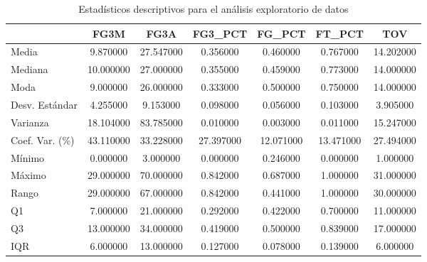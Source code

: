 \begin{table}
\caption{Estadísticos descriptivos para el análisis exploratorio de datos}
\label{tab:estadisticos_descriptivos_eda}
\begin{tabular}{|l|c|c|c|c|c|c|}
\toprule
 & FG3M & FG3A & FG3\_PCT & FG\_PCT & FT\_PCT & TOV \\
\midrule
Media & 9.870000 & 27.547000 & 0.356000 & 0.460000 & 0.767000 & 14.202000 \\
Mediana & 10.000000 & 27.000000 & 0.355000 & 0.459000 & 0.773000 & 14.000000 \\
Moda & 9.000000 & 26.000000 & 0.333000 & 0.500000 & 0.750000 & 14.000000 \\
Desv. Estándar & 4.255000 & 9.153000 & 0.098000 & 0.056000 & 0.103000 & 3.905000 \\
Varianza & 18.104000 & 83.785000 & 0.010000 & 0.003000 & 0.011000 & 15.247000 \\
Coef. Var. (\%) & 43.110000 & 33.228000 & 27.397000 & 12.071000 & 13.471000 & 27.494000 \\
Mínimo & 0.000000 & 3.000000 & 0.000000 & 0.246000 & 0.000000 & 1.000000 \\
Máximo & 29.000000 & 70.000000 & 0.842000 & 0.687000 & 1.000000 & 31.000000 \\
Rango & 29.000000 & 67.000000 & 0.842000 & 0.441000 & 1.000000 & 30.000000 \\
Q1 & 7.000000 & 21.000000 & 0.292000 & 0.422000 & 0.700000 & 11.000000 \\
Q3 & 13.000000 & 34.000000 & 0.419000 & 0.500000 & 0.839000 & 17.000000 \\
IQR & 6.000000 & 13.000000 & 0.127000 & 0.078000 & 0.139000 & 6.000000 \\
\bottomrule
\end{tabular}
\end{table}
